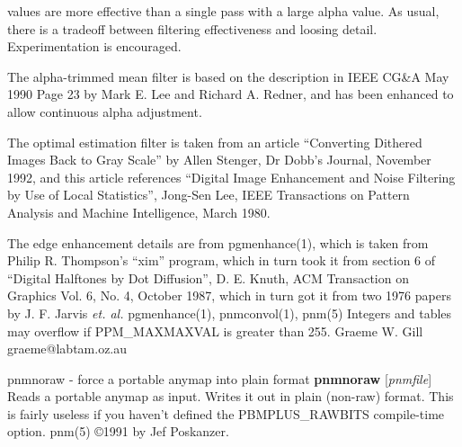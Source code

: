 values are more effective than a single pass with a large alpha value.
As usual, there is a tradeoff between filtering effectiveness and loosing
detail. Experimentation is encouraged.
\par
The alpha-trimmed mean filter is 
based on the description in IEEE CG\&A May 1990 
Page 23 by Mark E. Lee and Richard A. Redner,
and has been enhanced to allow continuous alpha adjustment.
\par
The optimal estimation filter is taken from an article ``Converting Dithered
Images Back to Gray Scale'' by Allen Stenger, Dr Dobb's Journal, November
1992, and this article references ``Digital Image Enhancement and Noise Filtering by
Use of Local Statistics'', Jong-Sen Lee, IEEE Transactions on Pattern Analysis and
Machine Intelligence, March 1980.
\par
The edge enhancement details are from pgmenhance(1),
which is taken from Philip R. Thompson's ``xim''
program, which in turn took it from section 6 of ``Digital Halftones by
Dot Diffusion'', D. E. Knuth, ACM Transaction on Graphics Vol. 6, No. 4,
October 1987, which in turn got it from two 1976 papers by J. F. Jarvis
{\it et. al.}
pgmenhance(1), pnmconvol(1), pnm(5)
Integers and tables may overflow if PPM\_MAXMAXVAL is greater than 255.
Graeme W. Gill    graeme@labtam.oz.au
%
 
%

\newpage
%

pnmnoraw - force a portable anymap into plain format
{\bf pnmnoraw}
{\rm [}{\it pnmfile}{\rm ]}
Reads a portable anymap as input.
Writes it out in plain (non-raw) format.
This is fairly useless if you haven't defined the PBMPLUS\_RAWBITS
compile-time option.
pnm(5)
\copyright 1991 by Jef Poskanzer.
%
 
